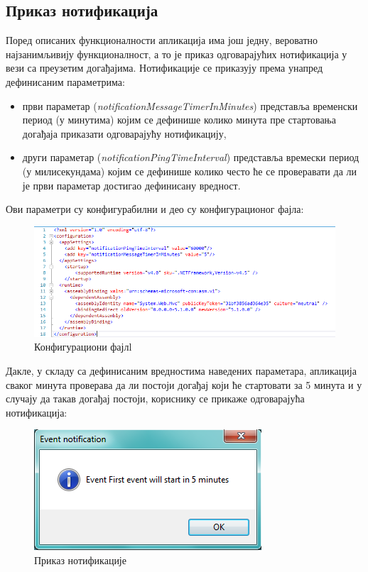 \subsection{Приказ нотификација}

Поред описаних функционалности апликација има још једну, вероватно најзанимљивију функционалност, а то је приказ одговарајућих нотификација у вези са преузетим догађајима. Нотификације се приказују према унапред дефинисаним параметрима:
\begin{itemize}
	\item{први параметар (\textit{notificationMessageTimerInMinutes}) представља временски период (у минутима) којим се дефинише колико минута пре стартовања догађаја приказати одговарајућу нотификацију},
	\item{други параметар (\textit{notificationPingTimeInterval}) представља времески период (у милисекундама) којим се дефинише колико често ће се проверавати да ли је први параметар достигао дефинисану вредност}.	

\end{itemize}
Ови параметри су конфигурабилни и део су конфигурационог фајла:

\begin{figure}[H]
	\centering
	\includegraphics[scale=0.5]{slike/AppConfig.png}
	\caption{Конфигурациони фајлl}
	\label{fig:app_config}
\end{figure}

Дакле, у складу са дефинисаним вредностима наведених параметара, апликација сваког минута проверава да ли постоји догађај који ће стартовати за 5 минута и у случају да такав догађај постоји, кориснику се прикаже одговарајућа нотификација:

\begin{figure}[H]
	\centering
	\includegraphics[scale=0.5]{slike/EventNotification.png}
	\caption{Приказ нотификације}
	\label{fig:event_notification}
\end{figure}

